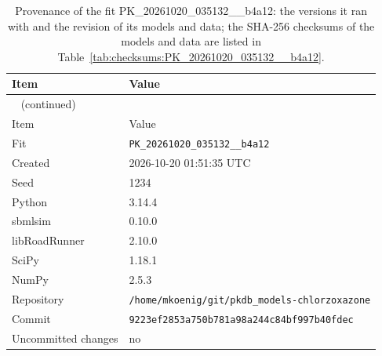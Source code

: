 \begin{longtable}{ll}
\caption{Provenance of the fit PK\_20261020\_035132\_\_b4a12: the versions it ran with and the revision of its models and data; the SHA-256 checksums of the models and data are listed in Table~\ref{tab:checksums:PK_20261020_035132__b4a12}.}\label{tab:provenance:PK_20261020_035132__b4a12} \\
\toprule
Item & Value \\
\midrule
\endfirsthead
\multicolumn{2}{l}{\small\tablename~\thetable{} (continued)} \\
\toprule
Item & Value \\
\midrule
\endhead
\bottomrule
\endlastfoot
Fit & \texttt{PK\_20261020\_035132\_\_b4a12} \\
Created & 2026-10-20 01:51:35 UTC \\
Seed & 1234 \\
Python & 3.14.4 \\
sbmlsim & 0.10.0 \\
libRoadRunner & 2.10.0 \\
SciPy & 1.18.1 \\
NumPy & 2.5.3 \\
Repository & \texttt{/home/mkoenig/git/pkdb\_models-chlorzoxazone} \\
Commit & \texttt{9223ef2853a750b781a98a244c84bf997b40fdec} \\
Uncommitted changes & no \\
\end{longtable}



